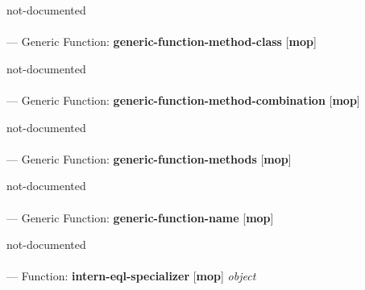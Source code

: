 \begin{adjustwidth}{5em}{5em}
not-documented
\end{adjustwidth}

\paragraph{}
\label{MOP:GENERIC-FUNCTION-METHOD-CLASS}
--- Generic Function: \textbf{generic-function-method-class} [\textbf{mop}] \textit{}

\begin{adjustwidth}{5em}{5em}
not-documented
\end{adjustwidth}

\paragraph{}
\label{MOP:GENERIC-FUNCTION-METHOD-COMBINATION}
--- Generic Function: \textbf{generic-function-method-combination} [\textbf{mop}] \textit{}

\begin{adjustwidth}{5em}{5em}
not-documented
\end{adjustwidth}

\paragraph{}
\label{MOP:GENERIC-FUNCTION-METHODS}
--- Generic Function: \textbf{generic-function-methods} [\textbf{mop}] \textit{}

\begin{adjustwidth}{5em}{5em}
not-documented
\end{adjustwidth}

\paragraph{}
\label{MOP:GENERIC-FUNCTION-NAME}
--- Generic Function: \textbf{generic-function-name} [\textbf{mop}] \textit{}

\begin{adjustwidth}{5em}{5em}
not-documented
\end{adjustwidth}

\paragraph{}
\label{MOP:INTERN-EQL-SPECIALIZER}
--- Function: \textbf{intern-eql-specializer} [\textbf{mop}] \textit{object}

